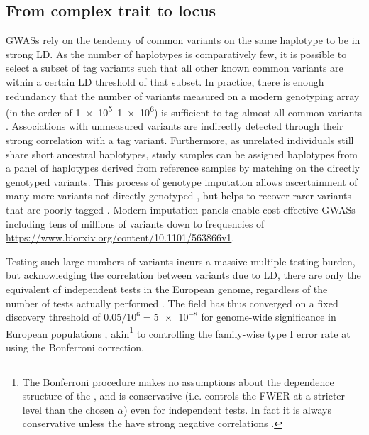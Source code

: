 \begin{outline}
\subsection{From complex trait to locus}

\glspl{GWAS} rely on the tendency of common variants on the same haplotype to be in strong \gls{LD}.
As the number of haplotypes is comparatively few, 
it is possible to select a subset of tag variants such that all other known common variants are within a certain \gls{LD} threshold of that subset. 
In practice, there is enough redundancy that the number of variants measured on a modern genotyping array (in the order of \numrange[retain-unity-mantissa=false]{1e5}{1e6}) is sufficient to tag almost all common variants  \autocite{theinternationalhapmapconsortium2005HaplotypeMapHuman,barrett2006EvaluatingCoverageGenomewide}.
Associations with unmeasured variants are indirectly detected through their strong correlation with a tag variant.
Furthermore, as unrelated individuals still share short ancestral haplotypes, 
study samples can be assigned haplotypes from a panel of haplotypes derived from reference samples by matching on the directly genotyped variants.
This process of genotype imputation allows ascertainment of many more variants not directly genotyped \autocite{das2018GenotypeImputationLarge},
but helps to recover rarer variants that are poorly-tagged \autocite{visscher201710YearsGWAS}.
Modern imputation panels enable cost-effective \glspl{GWAS} including tens of millions of variants down to frequencies of  \url{https://www.biorxiv.org/content/10.1101/563866v1}.

Testing such large numbers of variants incurs a massive multiple testing burden, but acknowledging the correlation between variants due to \gls{LD},
there are only the equivalent of  independent tests in the European genome, regardless of the number of tests actually performed \autocite{peer2008EstimationMultipleTesting}.
The field has thus converged on a fixed discovery threshold of $0.05 / 10^6 = \num{5e-8}$ for genome-wide significance in European populations \autocite{jannot2015108HasEmerged}, akin\footnote{
    The Bonferroni procedure makes no assumptions about the dependence structure of the \pvalues{}, and is conservative (i.e. controls the \gls{FWER} at a stricter level than the chosen $\alpha$) even for independent tests. In fact it is always conservative unless the \pvalues{} have strong negative correlations \autocite{goeman2014MultipleHypothesisTesting}.
}
to controlling the family-wise type I error rate at using the Bonferroni correction.


\end{outline}
